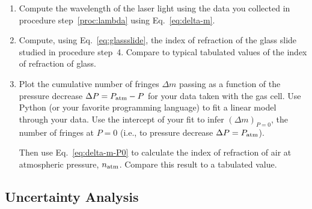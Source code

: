 \documentclass{tufte-handout}
\begin{document}
\begin{enumerate}
\item Compute the wavelength of the laser light using the data you collected in
  procedure step~\ref{proc:lambda} using Eq.~\ref{eq:delta-m}.

\item Compute, using Eq.~\ref{eq:glassslide}, the index of refraction of the
  glass slide studied in procedure step~4. Compare to typical tabulated values
  of the index of refraction of glass.

\item Plot the cumulative number of fringes $\Delta m$ passing 
as a function of the pressure decrease $\Delta P = P_{\rm atm} - 
P$ for your data taken with the gas cell. Use Python (or your favorite
programming language) to fit a linear model through your data.
Use the intercept of your fit to infer $(\Delta m)_{P=0}$, the number of fringes
at $P=0$ (i.e., to pressure decrease $\Delta P = P_{\rm atm}$). 

Then use Eq.~\ref{eq:delta-m-P0} to calculate the index of refraction of air 
at atmospheric pressure, $n_{\rm atm}$. Compare this result to a tabulated 
value.

\end{enumerate}

\subsection{Uncertainty Analysis}
\end{document}
